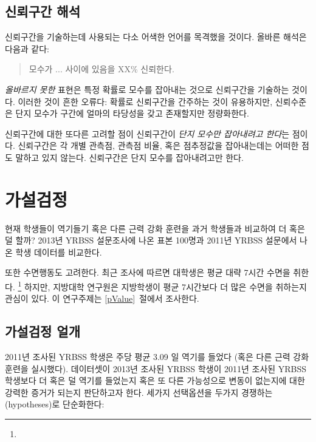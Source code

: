 \subsection{신뢰구간 해석}
\label{interpretingCIs}

신뢰구간을 기술하는데 사용되는 다소 어색한 언어를 목격했을 것이다. 올바른 해석은 다음과 같다:

\begin{quote}
모수가 ... 사이에 있음을 XX\% 신뢰한다.
\end{quote}

\emph{올바르지 못한} 표현은 특정 확률로 모수를 잡아내는 것으로 신뢰구간을 기술하는 것이다. 이러한 것이 흔한 오류다: 확률로 신뢰구간을 간주하는 것이 유용하지만, 신뢰수준은 단지 모수가 구간에 얼마의 타당성을 갖고 존재할지만 정량화한다.

신뢰구간에 대한 또다른 고려할 점이 신뢰구간이 \emph{단지 모수만 잡아내려고 한다}는 점이다. 신뢰구간은 각 개별 관측점, 관측점 비율, 혹은 점추정값을 잡아내는데는 어떠한 점도 말하고 있지 않는다. 신뢰구간은 단지 모수를 잡아내려고만 한다.



\section[Hypothesis testing]{가설검정 }
\label{hypothesisTesting}


현재 학생들이 역기들기 혹은 다른 근력 강화 훈련을 과거 학생들과 비교하여 더 혹은 덜 할까? 2013년 YRBSS 설문조사에 나온 표본 100명과 2011년 YRBSS 설문에서 나온 학생 데이터를 비교한다.

또한 수면행동도 고려한다. 최근 조사에 따르면 대학생은 평균 대략 7시간 수면을 취한다. \footnote{} 하지만, 지방대학 연구원은 지방학생이 평균 7시간보다 더 많은 수면을 취하는지 관심이 있다. 이 연구주제는 \ref{pValue}~절에서 조사한다.

\subsection{가설검정 얼개}

2011년 조사된 YRBSS 학생은 주당 평균 3.09 일 역기를 들었다 (혹은 다른 근력 강화 훈련을 실시했다).  데이터셋이 2013년 조사된 YRBSS 학생이 2011년 조사된 YRBSS 학생보다 더 혹은 덜 역기를 들었는지 혹은 또 다른 가능성으로 변동이 없는지에 대한 강력한 증거가 되는지 판단하고자 한다. 세가지 선택옵션을 두가지 경쟁하는 (hypotheses)로 단순화한다:

